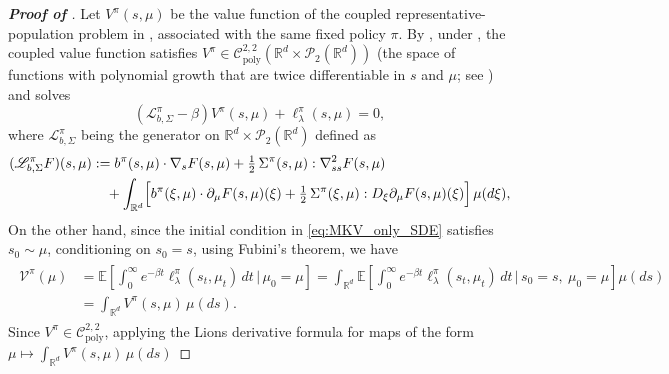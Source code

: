 \documentclass[a4paper, 10pt, english, reqno]{amsart}
\begin{document}
\begin{proof}[\textbf{Proof of }]
Let $V^\pi(s,\mu)$ be the value function of the coupled
representative-population problem in \cite{firstpaper}, associated with
the same fixed policy $\pi$. By \cite[Theorem 3.3]
{firstpaper}, under , the coupled value
function satisfies $ V^\pi\in
  \mathcal C^{2,2}_{\mathrm{poly}}
  (\mathbb R^d\times\mathcal P_2(\mathbb R^d))$ (the space of functions with polynomial growth that are twice differentiable in $s$ and $\mu$; see \cite[Definition 3.1]{firstpaper}) and solves
\begin{equation}
\label{eq:coupled-HJB-used-mkv}
  (\mathscr L_{b,\Sigma}^{\pi}-\beta)V^\pi(s,\mu)
  +\ell_\lambda^\pi(s,\mu)=0,
\end{equation}
where $\mathscr L_{b,\Sigma}^{\pi}$ being the generator on
$\mathbb R^d\times\mathcal P_2(\mathbb R^d)$ defined as
\begin{equation}
  \label{eq:L-pi}
  \begin{aligned}
    (\mathscr{L}_{b,\Sigma}^{\pi}F)(s,\mu)
    &:=
    b^{\pi}(s,\mu)\cdot\nabla_s F(s,\mu)
    + \tfrac{1}{2}\,\Sigma^{\pi}(s,\mu) : \nabla^2_{ss} F(s,\mu)\\
    &\quad + \int_{\mathbb{R}^d}
      \Bigl[
        b^{\pi}(\xi,\mu)\cdot \partial_{\mu}F(s,\mu)(\xi)
        + \tfrac{1}{2}\,\Sigma^{\pi}(\xi,\mu)
          : D_\xi\partial_{\mu}F(s,\mu)(\xi)
      \Bigr]\,\mu(d\xi),
  \end{aligned}
\end{equation}
On the other hand, since the initial condition in
\eqref{eq:MKV_only_SDE} satisfies $s_0\sim\mu$, conditioning on
$s_0=s$, using Fubini's theorem, we have
\begin{align}\label{eq:mkv-value-as-integrated-coupled-value}
\begin{aligned}
  \mathcal V^\pi(\mu)
  &=
  \mathbb E\left[
    \int_0^\infty e^{-\beta t}
    \ell_\lambda^\pi(s_t,\mu_t)\,dt
    \,\bigg|\,\mu_0=\mu
  \right] =
  \int_{\mathbb R^d}
  \mathbb E\left[
    \int_0^\infty e^{-\beta t}
    \ell_\lambda^\pi(s_t,\mu_t)\,dt
    \,\bigg|\,s_0=s,\ \mu_0=\mu
  \right]\mu(ds)                                             \\
  &=
  \int_{\mathbb R^d}V^\pi(s,\mu)\,\mu(ds).
\end{aligned}
\end{align}
Since $V^\pi\in\mathcal C^{2,2}_{\mathrm{poly}}$, applying the Lions
derivative formula for maps of the form
$\mu\mapsto\int_{\mathbb R^d} V^\pi(s,\mu)\,\mu(ds)$

\end{proof}
\end{document}
